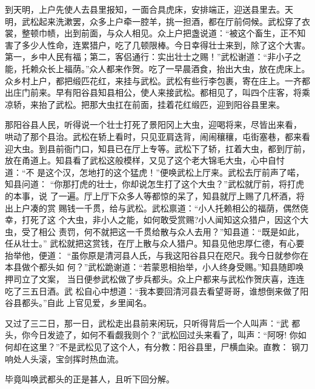 到天明，上户先使人去县里报知，一面合具虎床，安排端正，迎送县里去。天
明，武松起来洗漱罢，众多上户牵一腔羊，挑一担酒，都在厅前伺候。武松穿了衣
裳，整顿巾帻，出到前面，与众人相见。众上户把盏说道：“被这个畜生，正不知
害了多少人性命，连累猎户，吃了几顿限棒。今日幸得壮士来到，除了这个大害。
第一，乡中人民有福；第二，客侣通行：实出壮士之赐！”武松谢道：“非小子之
能，托赖众长上福荫。”众人都来作贺。吃了一早晨酒食，抬出大虫，放在虎床上。
众乡村上户，都把缎匹花红，来挂与武松。武松有些行李包裹，寄在庄上。一齐都
出庄门前来。早有阳谷县知县相公，使人来接武松。都相见了，叫四个庄客，将乘
凉轿，来抬了武松。把那大虫扛在前面，挂着花红缎匹，迎到阳谷县里来。

那阳谷县人民，听得说一个壮士打死了景阳冈上大虫，迎喝将来，尽皆出来看，
哄动了那个县治。武松在轿上看时，只见亚肩迭背，闹闹穰穰，屯街塞巷，都来看
迎大虫。到县前衙门口，知县已在厅上专等。武松下了轿，扛着大虫，都到厅前，
放在甬道上。知县看了武松这般模样，又见了这个老大锦毛大虫，心中自忖道：“不
是这个汉，怎地打的这个猛虎！”便唤武松上厅来。武松去厅前声了喏，知县问道：
“你那打虎的壮士，你却说怎生打了这个大虫？”武松就厅前，将打虎的本事，说
了一遍。厅上厅下众多人等都惊的呆了，知县就厅上赐了几杯酒，将出上户凑的赏
赐钱一千贯，给与武松。武松禀道：“小人托赖相公的福荫，偶然侥幸，打死了这
个大虫，非小人之能，如何敢受赏赐?小人闻知这众猎户，因这个大虫，受了相公
责罚，何不就把这一千贯给散与众人去用？”知县道：“既是如此，任从壮士。”
武松就把这赏钱，在厅上散与众人猎户。知县见他忠厚仁德，有心要抬举他，便道：
“虽你原是清河县人氏，与我这阳谷县只在咫尺。我今日就参你在本县做个都头如
何？”武松跪谢道：“若蒙恩相抬举，小人终身受赐。”知县随即唤押司立了文案，
当日便参武松做了步兵都头。众上户都来与武松作贺庆喜，连连吃了三五日酒。武
松自心中想道：“我本要回清河县去看望哥哥，谁想倒来做了阳谷县都头。”自此
上官见爱，乡里闻名。

又过了三二日，那一日，武松走出县前来闲玩，只听得背后一个人叫声：“武
都头，你今日发迹了，如何不看觑我则个？”武松回过头来看了，叫声：“阿呀!
你如何却在这里？”不是武松见了这个人，有分教：阳谷县里，尸横血染。直教：
钢刀响处人头滚，宝剑挥时热血流。

毕竟叫唤武都头的正是甚人，且听下回分解。